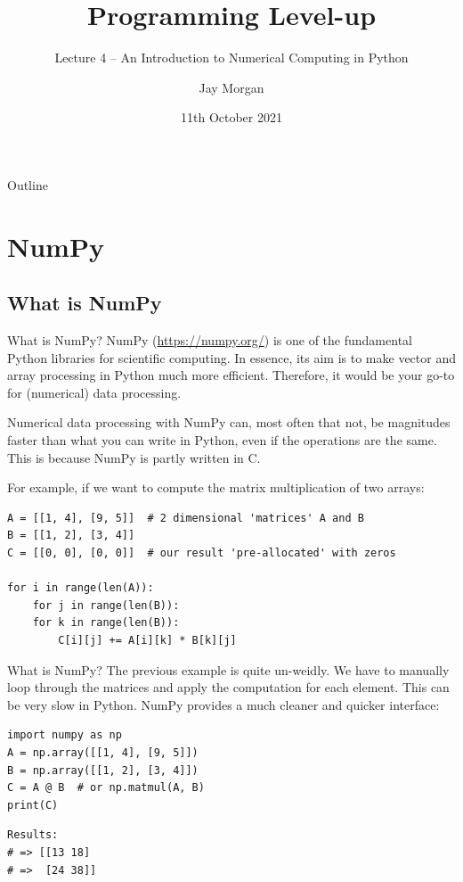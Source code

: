 \documentclass[10pt]{beamer}
\author{Jay Morgan}
\date{11th October 2021}
\title{Programming Level-up}
\subtitle{Lecture 4 -- An Introduction to Numerical Computing in Python}
\begin{document}
\maketitle
\begin{frame}{Outline}
\tableofcontents
\end{frame}


\section{NumPy}
\label{sec:org0736a47}

\subsection{What is NumPy}
\label{sec:org82388ca}

\begin{frame}[label={sec:org089da48},fragile]{What is NumPy?}
 NumPy (\url{https://numpy.org/}) is one of the fundamental Python libraries for scientific
computing. In essence, its aim is to make vector and array processing in Python much
more efficient. Therefore, it would be your go-to for (numerical) data
processing.

Numerical data processing with NumPy can, most often that not, be magnitudes faster
than what you can write in Python, even if the operations are the same. This is
because NumPy is partly written in C.

For example, if we want to compute the matrix multiplication of two arrays:

\begin{verbatim}
A = [[1, 4], [9, 5]]  # 2 dimensional 'matrices' A and B
B = [[1, 2], [3, 4]]
C = [[0, 0], [0, 0]]  # our result 'pre-allocated' with zeros

for i in range(len(A)):
    for j in range(len(B)):
	for k in range(len(B)):
	    C[i][j] += A[i][k] * B[k][j]
\end{verbatim}
\end{frame}

\begin{frame}[label={sec:orgf80f70b},fragile]{What is NumPy?}
 The previous example is quite un-weidly. We have to manually loop through the
matrices and apply the computation for each element. This can be \alert{very} slow in
Python. NumPy provides a much cleaner and quicker interface:

\begin{verbatim}
import numpy as np
A = np.array([[1, 4], [9, 5]])
B = np.array([[1, 2], [3, 4]])
C = A @ B  # or np.matmul(A, B)
print(C)
\end{verbatim}

\begin{verbatim}
Results: 
# => [[13 18]
# =>  [24 38]]
\end{verbatim}
\end{frame}
\end{document}
